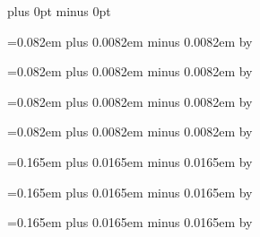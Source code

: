 \def\endofsyllable{%
\penalty -500%
}


\def\endofelement#1{%
\ifcase#1%
\hskip\interelementspace%
\or%
\hskip\largerspace%
\or%
\hskip\glyphspace%
\fi%
\penalty -100%
}


\def\endofglyph#1{%
\ifcase#1%
\hskip\interglyphspace %
\or%
\hskip\zerowidthspace %
\or%
\hskip\alterationspace %
\or%
\hskip\punctuminclinatumshift %
\or%
\hskip\bispace %
\or%
\hskip\trispace %
\fi%
\penalty 10001%
}


\newskip\zerowidthspace
\zerowidthspace=0pt plus 0pt minus 0pt

\newskip\interglyphspace
\interglyphspace=0.082em plus 0.0082em minus 0.0082em
\multiply\interglyphspace by \factor

\newskip\alterationspace
\alterationspace=0.082em plus 0.0082em minus 0.0082em
\multiply\alterationspace by \factor

\newskip\interelementspace
\interelementspace=0.082em plus 0.0082em minus 0.0082em
\multiply\interelementspace by \factor

\newskip\largerspace
\largerspace=0.082em plus 0.0082em minus 0.0082em
\multiply\largerspace by \factor

\newskip\glyphspace
\glyphspace=0.165em plus 0.0165em minus 0.0165em
\multiply\glyphspace by \factor

\newskip\spacebeforecusto
\spacebeforecusto=0.165em plus 0.0165em minus 0.0165em
\multiply\spacebeforecusto by \factor

\newskip\spaceafterlineclef
\spaceafterlineclef=0.165em plus 0.0165em minus 0.0165em
\multiply\spaceafterlineclef by \factor

